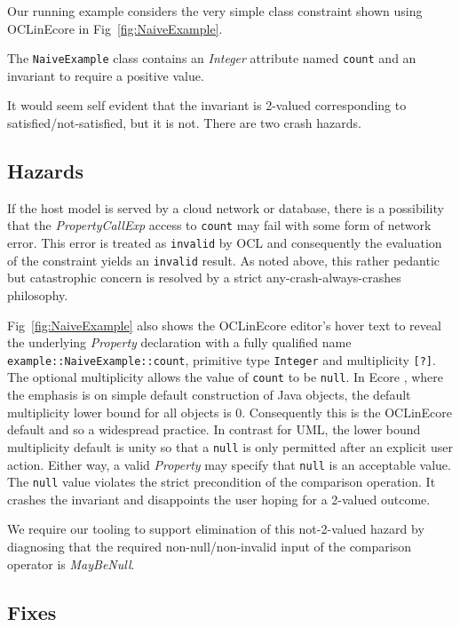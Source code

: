 \documentclass[
]{ceurart}
\begin{document}
Our running example considers the very simple class constraint shown using OCLinEcore\cite{OCLinEcore} in Fig~\ref{fig:NaiveExample}.

The \verb|NaiveExample| class contains an \emph{Integer} attribute named \verb|count| and an invariant to require a positive value.

It would seem self evident that the invariant is 2-valued corresponding to satisfied/not-satisfied, but it is not. There are two crash hazards.

\subsection{Hazards}

If the host model is served by a cloud network or database, there is a possibility that the \emph{PropertyCallExp} access to \verb|count| may fail with some form of network error. This error is treated as \verb|invalid| by OCL and consequently the evaluation of the constraint yields an \verb|invalid| result. As noted above, this rather pedantic but catastrophic concern is resolved by a strict any-crash-always-crashes philosophy.

Fig~\ref{fig:NaiveExample} also shows the OCLinEcore editor's hover text to
reveal the underlying \emph{Property} declaration with a fully qualified name \verb|example::NaiveExample::count|, primitive type \verb|Integer| and multiplicity \verb|[?]|. The optional multiplicity allows the value of \verb|count| to be \verb|null|. In Ecore \cite{EMF}, where the emphasis is on simple default construction of Java objects, the default multiplicity lower bound for all objects is 0. Consequently this is the OCLinEcore default and so a widespread practice. In contrast for UML, the lower bound multiplicity default is unity so that a \verb|null| is only permitted after an explicit user action. Either way, a valid \emph{Property} may specify that \verb|null| is an acceptable value. The \verb|null| value violates the strict precondition of the comparison operation. It crashes the invariant and disappoints the user hoping for a 2-valued outcome.

We require our tooling to support elimination of this not-2-valued hazard by diagnosing that the required non-null/non-invalid input of the comparison operator is \emph{MayBeNull}.

\subsection{Fixes}
\end{document}
